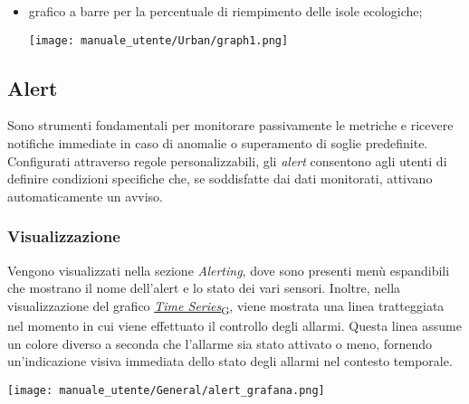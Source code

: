 \begin{itemize}
\begin{itemize}
\begin{center}
        \end{center}
        \item grafico a barre per la percentuale di riempimento delle isole ecologiche;
        \begin{center}
            \texttt{[image: manuale\_utente/Urban/graph1.png]}
        \end{center}
    \end{itemize}
\end{itemize}

\subsection{Alert}
Sono strumenti fondamentali per monitorare passivamente le metriche e ricevere notifiche immediate in caso di anomalie o superamento di soglie predefinite. Configurati attraverso regole personalizzabili, gli \textit{alert} consentono agli utenti di definire condizioni specifiche che, se soddisfatte dai dati monitorati, attivano automaticamente un avviso.
\subsubsection{Visualizzazione}
Vengono visualizzati nella sezione \textit{Alerting}, dove sono presenti menù espandibili che mostrano il nome dell'alert e lo stato dei vari sensori. Inoltre, nella visualizzazione del grafico \href{https://7last.github.io/docs/pb/documentazione-interna/glossario\#time-series}{\textit{Time Series}\textsubscript{G}}, viene mostrata una linea tratteggiata nel momento in cui viene effettuato il controllo degli allarmi. Questa linea assume un colore diverso a seconda che l'allarme sia stato attivato o meno, fornendo un'indicazione visiva immediata dello stato degli allarmi nel contesto temporale.
\begin{center}
    \texttt{[image: manuale\_utente/General/alert\_grafana.png]}
\end{center} 

